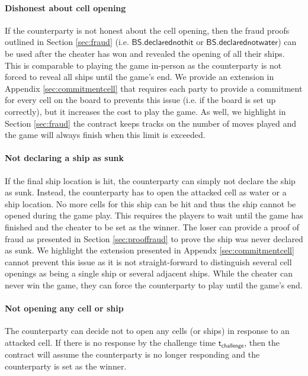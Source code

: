 \documentclass{llncs}
\newcommand{\battleshipdeclarednothit}{\mathsf{BS.declarednothit}}
\newcommand{\battleshipdeclarednotwater}{\mathsf{BS.declarednotwater}}
\newcommand{\timechallenge}{\mathsf{t}_{\mathsf{challenge}}}
\begin{document}
	\paragraph{Dishonest about cell opening}
	If the counterparty is not honest about the cell opening, then the fraud proofs outlined in Section \ref{sec:fraud} (i.e. $\battleshipdeclarednothit$ or $\battleshipdeclarednotwater$) can be used after the cheater has won and revealed the opening of all their ships. 
	This is comparable to playing the game in-person as the counterparty is not forced to reveal all ships until the game's end. 
	We provide an extension in Appendix \ref{sec:commitmentcell} that requires each party to provide a commitment for every cell on the board to prevents this issue (i.e. if the board is set up correctly), but it increases the cost to play the game. 
	As well, we highlight in Section \ref{sec:fraud} the contract keeps tracks on the number of moves played and the game will always finish when this limit is exceeded. 
	
	\paragraph{Not declaring a ship as sunk}
	If the final ship location is hit, the counterparty can simply not declare the ship as sunk.
	Instead, the counterparty has to open the attacked cell as water or a ship location.
	No more cells for this ship can be hit and thus the ship cannot be opened during the game play. 
	This requires the players to wait until the game has finished and the cheater to be set as the winner. 
	The loser can provide a proof of fraud as presented in Section \ref{sec:prooffraud} to prove the ship was never declared as sunk. 
	We highlight the extension presented in Appendx \ref{sec:commitmentcell} cannot prevent this issue as it is not straight-forward to distinguish several cell openings as being a single ship or several adjacent ships.
	While the cheater can never win the game,  they can force the counterparty to play until the game's end. 
	
	\paragraph{Not opening any cell or ship}
	The counterparty can decide not to open any cells (or ships) in response to an attacked cell. If there is no response by the challenge time $\timechallenge$, then the contract will assume the counterparty is no longer responding and the counterparty is set as the winner. 
	
\end{document}
